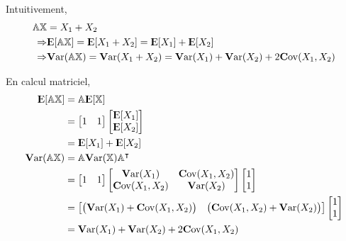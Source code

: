 \documentclass[11pt,french]{report}
\newcommand{\E}{{\rm I\kern-.3em E}}
\newcommand{\Var}{\mathrm{\textbf{V}ar}}
\newcommand{\Cov}{\mathrm{\textbf{C}ov}}
\begin{document}
Intuitivement,
\begin{align*}
\mathbb{A} \mathbb{X} &= X_1 + X_2  \\
\Rightarrow & \E[\mathbb{A} \mathbb{X}] = \E[X_1 + X_2] = \E[X_1] + \E[X_2] \\
\Rightarrow & \Var(\mathbb{A} \mathbb{X})= \Var(X_1 + X_2) = \Var(X_1) + \Var(X_2) + 2\Cov(X_1, X_2) \\
\end{align*}

En calcul matriciel,
\begin{align*}
\E[\mathbb{A} \mathbb{X}] &= \mathbb{A} \E[\mathbb{X}]  \\
&= 
\begin{bmatrix} 
     1 & 1 \\
\end{bmatrix} 
\begin{bmatrix} 
     \E[X_1] \\
     \E[X_2]\\
\end{bmatrix} \\
&= \E[X_1] + \E[X_2] \\
\Var(\mathbb{A} \mathbb{X}) &= \mathbb{A}\Var(\mathbb{X})\mathbb{A}^\intercal \\
&= 
\begin{bmatrix} 
     1 & 1 \\
\end{bmatrix}
\begin{bmatrix} 
\Var(X_1)  & \Cov(X_1,X_2) \\
\Cov(X_1,X_2) & \Var(X_2)\\
\end{bmatrix} 
\begin{bmatrix} 
     1  \\
     1  \\
\end{bmatrix}\\
&= 
\begin{bmatrix} 
\big(\Var(X_1)  + \Cov(X_1,X_2) \big) &\big(\Cov(X_1,X_2) + \Var(X_2) \big) 
\end{bmatrix}
\begin{bmatrix} 
     1  \\
     1  \\
\end{bmatrix}\\
&= \Var(X_1) + \Var(X_2) + 2\Cov(X_1, X_2) \\
\end{align*}
\end{document}

